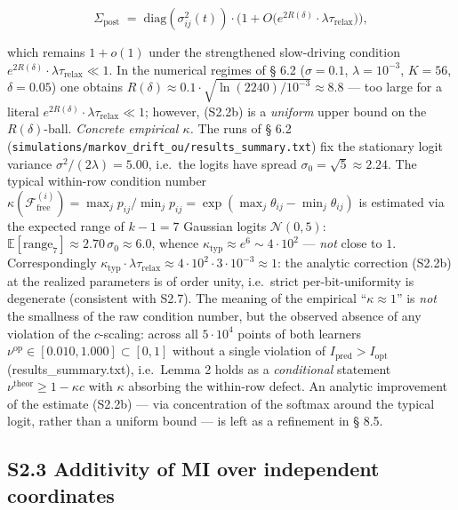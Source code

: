 \documentclass[pdflatex,sn-mathphys-ay]{sn-jnl}
\begin{document}
\begin{equation}\Sigma_{\text{post}} \;=\; \text{diag}(\sigma_{ij}^2(t)) \cdot \bigl(1 + O\bigl(e^{2R(\delta)} \cdot \lambda \tau_{\text{relax}}\bigr)\bigr), \tag{S2.2b}\end{equation}



which remains \(1 + o(1)\) under the strengthened slow-driving condition \(e^{2R(\delta)} \cdot \lambda \tau_{\text{relax}} \ll 1\). In the numerical regimes of § 6.2 (\(\sigma = 0.1\), \(\lambda = 10^{-3}\), \(K = 56\), \(\delta = 0.05\)) one obtains \(R(\delta) \approx 0.1 \cdot \sqrt{\ln(2240) / 10^{-3}} \approx 8.8\) --- too large for a literal \(e^{2R(\delta)} \cdot \lambda \tau_{\text{relax}} \ll 1\); however, (S2.2b) is a \emph{uniform} upper bound on the \(R(\delta)\)-ball. \emph{Concrete empirical \(\kappa\).} The runs of § 6.2 (\texttt{simulations/markov\_drift\_ou/results\_summary.txt}) fix the stationary logit variance \(\sigma^2/(2\lambda) = 5.00\), i.e.~the logits have spread \(\sigma_0 = \sqrt5 \approx 2.24\). The typical within-row condition number \(\kappa(\mathcal{F}^{(i)}_{\text{free}}) = \max_j p_{ij}/\min_j p_{ij} = \exp(\max_j\theta_{ij} - \min_j\theta_{ij})\) is estimated via the expected range of \(k-1 = 7\) Gaussian logits \(\mathcal{N}(0, 5)\): \(\mathbb{E}[\text{range}_7] \approx 2.70\,\sigma_0 \approx 6.0\), whence \(\kappa_{\text{typ}} \approx e^{6} \sim 4\cdot 10^{2}\) --- \emph{not} close to \(1\). Correspondingly \(\kappa_{\text{typ}}\cdot\lambda\tau_{\text{relax}} \approx 4\cdot10^2 \cdot 3\cdot10^{-3} \approx 1\): the analytic correction (S2.2b) at the realized parameters is of order unity, i.e.~strict per-bit-uniformity is degenerate (consistent with S2.7). The meaning of the empirical ``\(\kappa \approx 1\)'' is \emph{not} the smallness of the raw condition number, but the observed absence of any violation of the \(c\)-scaling: across all \(5\cdot 10^4\) points of both learners \(\nu^{\text{op}}\in[0.010, 1.000]\subset[0,1]\) without a single violation of \(I_{\text{pred}} > I_{\text{opt}}\) (results\_summary.txt), i.e.~Lemma 2 holds as a \emph{conditional} statement \(\nu^{\text{theor}}\ge 1-\kappa c\) with \(\kappa\) absorbing the within-row defect. An analytic improvement of the estimate (S2.2b) --- via concentration of the softmax around the typical logit, rather than a uniform bound --- is left as a refinement in § 8.5.



\subsection*{S2.3 Additivity of MI over independent coordinates}\label{s2.3-additivity-of-mi-over-independent-coordinates}
\end{document}
